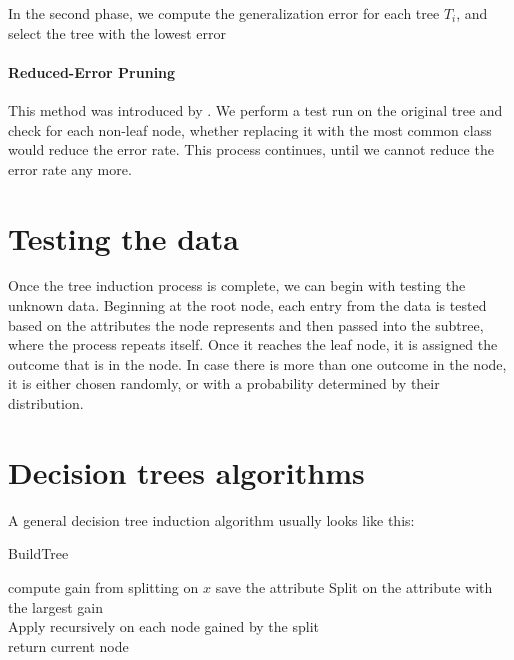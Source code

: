 \documentclass[thesis=B,english]{FITthesis}[2012/10/20]
\begin{document}
				In the second phase, we compute the generalization error for each tree \(T_i\), and select the tree with the lowest error

				\paragraph*{Reduced-Error Pruning}

				This method was introduced by \cite{Quinlan1987221}. We perform a test run on the original tree and check for each non-leaf node, whether replacing it with the most common class would reduce the error rate. This process continues, until we cannot reduce the error rate any more.

		\section{Testing the data}
		Once the tree induction process is complete, we can begin with testing the unknown data. Beginning at the root node, each entry from the data is tested based on the attributes the node represents and then passed into the subtree, where the process repeats itself. Once it reaches the leaf node, it is assigned the outcome that is in the node. In case there is more than one outcome in the node, it is either chosen randomly, or with a probability determined by their distribution.
		
		\section{Decision trees algorithms}

			A general decision tree induction algorithm usually looks like this:

			\begin{algorithm}[H]
			\caption{BuildTree}
			\SetAlgoLined
			\Begin
			{
			 {
				compute gain from splitting on $x$
				 {
					save the attribute
				}
			}
			Split on the attribute with the largest gain \\
			Apply recursively on each node gained by the split \\
			return current node
			}
			\end{algorithm}
\end{document}
